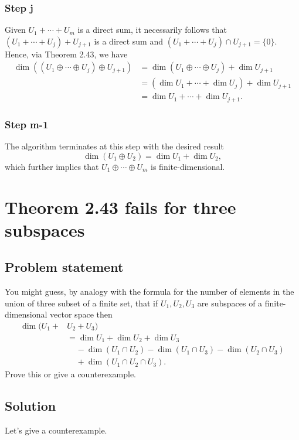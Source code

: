 \documentclass{article}
\begin{document}
\subsubsection*{Step j}
Given $U_1+\cdots + U_m$ is a direct sum, it necessarily follows that\newline $(U_1+\cdots+U_j)+U_{j+1}$ is a direct sum and $(U_1+\cdots+U_j)\cap U_{j+1}=\{0\}$. 
Hence, via Theorem 2.43, we have
\begin{align*}
    \dim((U_1\oplus\cdots\oplus U_j)\oplus U_{j+1})&=\dim (U_1\oplus\cdots\oplus U_j) +\dim U_{j+1}\\
    &=(\dim U_1+\cdots+\dim U_j)+\dim U_{j+1}\\
    &=\dim U_1+\cdots+\dim U_{j+1}.
\end{align*}

\subsubsection*{Step m-1}
The algorithm terminates at this step with the desired result
\[\dim(U_1\oplus U_2)=\dim U_1+\dim U_2,\]
which further implies that $U_1\oplus\cdots\oplus U_m$ is finite-dimensional.

\clearpage

\renewcommand{\thesection}{17}
\section{Theorem 2.43 fails for three subspaces}
\subsection*{Problem statement}
You might guess, by analogy with the formula for the number of elements in the union of three subset of a finite set, that if $U_1,U_2,U_3$ are subspaces of a finite-dimensional vector space then
\begin{align*}
    \dim(U_1+&U_2+U_3)\\
    &=\dim U_1+\dim U_2 + \dim U_3\\
    &\;\;\;\;-\dim(U_1\cap U_2)-\dim(U_1\cap U_3)-\dim(U_2\cap U_3)\\
    &\;\;\;\;+\dim(U_1\cap U_2\cap U_3).
\end{align*}
Prove this or give a counterexample.

\subsection*{Solution}
Let's give a counterexample. 
\end{document}
